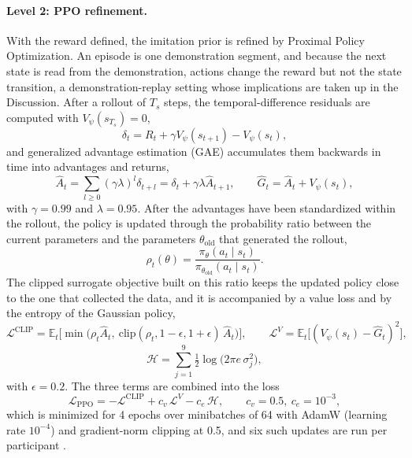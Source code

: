 \documentclass[utf8]{frontiers_suppmat}
\begin{document}
\paragraph*{Level 2: PPO refinement.} With the reward defined, the imitation prior is refined by Proximal Policy Optimization. An episode is one demonstration segment, and because the next state is read from the demonstration, actions change the reward but not the state transition, a demonstration-replay setting whose implications are taken up in the Discussion. After a rollout of $T_s$ steps, the temporal-difference residuals are computed with $V_\psi(s_{T_s})=0$,
\begin{equation}\label{eq:td}
\delta_t=R_t+\gamma V_\psi(s_{t+1})-V_\psi(s_t),
\end{equation}
and generalized advantage estimation (GAE) accumulates them backwards in time into advantages and returns,
\begin{equation}\label{eq:gae}
\hat A_t=\sum_{l\ge0}(\gamma\lambda)^{l}\delta_{t+l}=\delta_t+\gamma\lambda\hat A_{t+1},\qquad \hat G_t=\hat A_t+V_\psi(s_t),
\end{equation}
with $\gamma=0.99$ and $\lambda=0.95$. After the advantages have been standardized within the rollout, the policy is updated through the probability ratio between the current parameters and the parameters $\theta_{\mathrm{old}}$ that generated the rollout,
\begin{equation}\label{eq:ratio}
\rho_t(\theta)=\frac{\pi_\theta(a_t\mid s_t)}{\pi_{\theta_{\mathrm{old}}}(a_t\mid s_t)} .
\end{equation}
The clipped surrogate objective built on this ratio keeps the updated policy close to the one that collected the data, and it is accompanied by a value loss and by the entropy of the Gaussian policy,
\begin{equation}\label{eq:clip}
\mathcal L^{\mathrm{CLIP}}=\mathbb E_t\Big[\min\big(\rho_t\hat A_t,\ \mathrm{clip}(\rho_t,1-\epsilon,1+\epsilon)\,\hat A_t\big)\Big],\qquad \mathcal L^{V}=\mathbb E_t\big[(V_\psi(s_t)-\hat G_t)^{2}\big],
\end{equation}
\begin{equation}\label{eq:entropy}
\mathcal H=\sum_{j=1}^{9}\tfrac12\log\!\big(2\pi e\,\sigma_j^{2}\big),
\end{equation}
with $\epsilon=0.2$. The three terms are combined into the loss
\begin{equation}\label{eq:ppo}
\mathcal L_{\mathrm{PPO}}=-\mathcal L^{\mathrm{CLIP}}+c_v\,\mathcal L^{V}-c_e\,\mathcal H,\qquad c_v=0.5,\ c_e=10^{-3},
\end{equation}
which is minimized for 4 epochs over minibatches of 64 with AdamW (learning rate $10^{-4}$) and gradient-norm clipping at 0.5, and six such updates are run per participant \cite{Schulman2017,Larsen2021-gg}.
\end{document}
